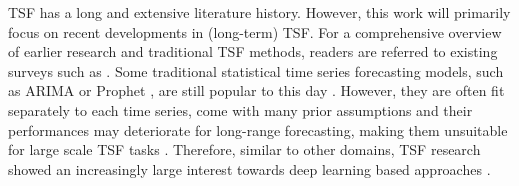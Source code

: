 \documentclass[a4paper,oneside,bibliography=totoc]{scrbook}
\begin{document}
TSF has a long and extensive literature history. However, this work will primarily focus on recent developments in (long-term) TSF.
For a comprehensive overview of earlier research and traditional TSF methods, readers are referred to existing surveys such as \citet{box_box_2013, box_time_2015, de_gooijer_25_2006, mahalakshmi_survey_2016, hamilton_time_1994}.
Some traditional statistical time series forecasting models, such as ARIMA \cite{box_distribution_1970} or Prophet \cite{taylor_forecasting_2018}, are still popular to this day \cite{long_forecasting_2023, ning_comparative_2022, albahli_lstm_2025}. 
However, they are often fit separately to each time series, come with many prior assumptions and their performances may deteriorate for long-range forecasting, making them unsuitable for large scale TSF tasks \cite{qin_dual-stage_2017, li_enhancing_2019}. 
Therefore, similar to other domains, TSF research showed an increasingly large interest towards deep learning based approaches \cite{benidis_deep_2022, hewamalage_recurrent_2021, lara-benitez_experimental_2021}. 
\newline
\end{document}
